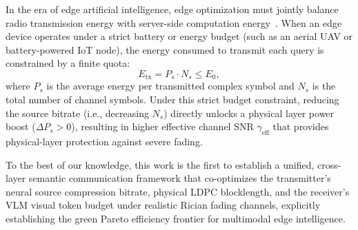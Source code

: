 In the era of edge artificial intelligence, edge optimization must jointly balance radio transmission energy with server-side computation energy~\cite{zhang2022task,sabanovic2026inarvl}. When an edge device operates under a strict battery or energy budget (such as an aerial UAV or battery-powered IoT node), the energy consumed to transmit each query is constrained by a finite quota:
\begin{equation}
E_{\mathrm{tx}} = P_s \cdot N_s \le E_0,
\end{equation}
where $P_s$ is the average energy per transmitted complex symbol and $N_s$ is the total number of channel symbols. Under this strict budget constraint, reducing the source bitrate (i.e., decreasing $N_s$) directly unlocks a physical layer power boost ($\Delta P_s > 0$), resulting in higher effective channel SNR $\gamma_{\mathrm{eff}}$ that provides physical-layer protection against severe fading.

To the best of our knowledge, this work is the first to establish a unified, cross-layer semantic communication framework that co-optimizes the transmitter's neural source compression bitrate, physical LDPC blocklength, and the receiver's VLM visual token budget under realistic Rician fading channels, explicitly establishing the green Pareto efficiency frontier for multimodal edge intelligence.
